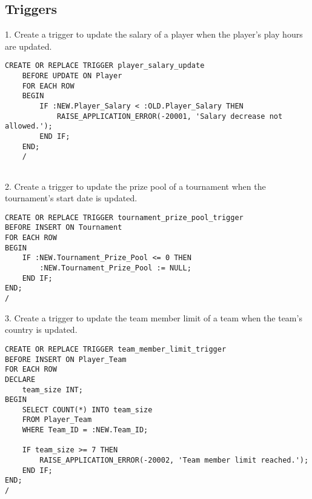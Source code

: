 \clearpage
\subsection{Triggers}
\hrulefill

1. Create a trigger to update the salary of a player when the player's play hours are updated.

\begin{lstlisting}[caption={ Query 1},label={lst:q-1}]
    CREATE OR REPLACE TRIGGER player_salary_update
    BEFORE UPDATE ON Player
    FOR EACH ROW
    BEGIN
        IF :NEW.Player_Salary < :OLD.Player_Salary THEN
            RAISE_APPLICATION_ERROR(-20001, 'Salary decrease not allowed.');
        END IF;
    END;
    /
    
\end{lstlisting}

2. Create a trigger to update the prize pool of a tournament when the tournament's start date is updated.

\begin{lstlisting}[caption={ Query 2},label={lst:q-2}]
    CREATE OR REPLACE TRIGGER tournament_prize_pool_trigger
BEFORE INSERT ON Tournament
FOR EACH ROW
BEGIN
    IF :NEW.Tournament_Prize_Pool <= 0 THEN
        :NEW.Tournament_Prize_Pool := NULL;
    END IF;
END;
/
\end{lstlisting}



3. Create a trigger to update the team member limit of a team when the team's country is updated.

\begin{lstlisting}[caption={ Query 3},label={lst:q-3}]
    CREATE OR REPLACE TRIGGER team_member_limit_trigger
BEFORE INSERT ON Player_Team
FOR EACH ROW
DECLARE
    team_size INT;
BEGIN
    SELECT COUNT(*) INTO team_size
    FROM Player_Team
    WHERE Team_ID = :NEW.Team_ID;
    
    IF team_size >= 7 THEN
        RAISE_APPLICATION_ERROR(-20002, 'Team member limit reached.');
    END IF;
END;
/
\end{lstlisting}
